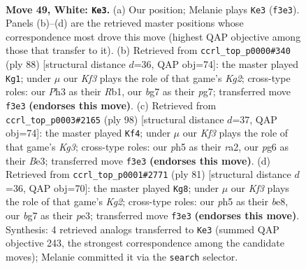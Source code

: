 \documentclass[11pt]{article}
\begin{document}
\clearpage

\begin{figure}[p]\centering
\begin{subfigure}{0.46\textwidth}\centering
\resizebox{\linewidth}{!}{%
\newchessgame
\chessboard[
  setfen={3R4/1p4bk/1N4p1/5p1p/P7/5KPP/2r2r2/8 w - - 0 49},
  showmover=false,
  pgfstyle=straightmove, color=movearrow, markmove={f3-e3}
]}
\caption{}
\end{subfigure}\hfill
\begin{subfigure}{0.46\textwidth}\centering
\resizebox{\linewidth}{!}{%
\newchessgame
\chessboard[
  setfen={7k/6p1/1R6/2N2p2/1P4pP/6P1/r4rK1/1R6 w - - 0 45},
  showmover=false,
  pgfstyle=straightmove, color=movearrow, markmove={g2-g1}
]}
\caption{}
\end{subfigure}
\\[4pt]
\begin{subfigure}{0.46\textwidth}\centering
\resizebox{\linewidth}{!}{%
\newchessgame
\chessboard[
  setfen={1R6/5kp1/3R4/3p1b1p/3P4/4BPKr/r7/8 w - - 8 50},
  showmover=false,
  pgfstyle=straightmove, color=movearrow, markmove={g3-f4}
]}
\caption{}
\end{subfigure}\hfill
\begin{subfigure}{0.46\textwidth}\centering
\resizebox{\linewidth}{!}{%
\newchessgame
\chessboard[
  setfen={2r1B3/5Rk1/1p2p1p1/7p/7P/4P3/1n3PPK/8 b - - 0 41},
  showmover=false,
  pgfstyle=straightmove, color=movearrow, markmove={g7-g8}
]}
\caption{}
\end{subfigure}
\caption{\textbf{Move 49, White: \texttt{Ke3}.} (a) Our position; Melanie plays \texttt{Ke3} (\texttt{f3e3}). Panels (b)--(d) are the retrieved master positions whose correspondence most drove this move (highest QAP objective among those that transfer to it). (b) Retrieved from \texttt{ccrl\_top\_p0000\#340} (ply 88) [structural distance $d$=36, QAP obj=74]: the master played \texttt{Kg1}; under $\mu$ our \emph{Kf3} plays the role of that game's \emph{Kg2}; cross-type roles: our \emph{P}h3 as their \emph{R}b1, our \emph{b}g7 as their \emph{p}g7; transferred move \texttt{f3e3} \textbf{(endorses this move)}. (c) Retrieved from \texttt{ccrl\_top\_p0003\#2165} (ply 98) [structural distance $d$=37, QAP obj=74]: the master played \texttt{Kf4}; under $\mu$ our \emph{Kf3} plays the role of that game's \emph{Kg3}; cross-type roles: our \emph{p}h5 as their \emph{r}a2, our \emph{p}g6 as their \emph{B}e3; transferred move \texttt{f3e3} \textbf{(endorses this move)}. (d) Retrieved from \texttt{ccrl\_top\_p0001\#2771} (ply 81) [structural distance $d$=36, QAP obj=70]: the master played \texttt{Kg8}; under $\mu$ our \emph{Kf3} plays the role of that game's \emph{Kg2}; cross-type roles: our \emph{p}h5 as their \emph{b}e8, our \emph{b}g7 as their \emph{p}e3; transferred move \texttt{f3e3} \textbf{(endorses this move)}. Synthesis: 4 retrieved analogs transferred to \texttt{Ke3} (summed QAP objective 243, the strongest correspondence among the candidate moves); Melanie committed it via the \texttt{search} selector.}
\label{fig:thought-m96}
\end{figure}
\end{document}
